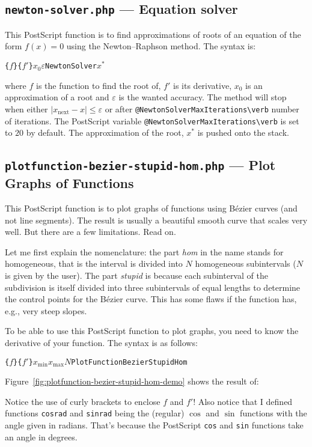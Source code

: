 \documentclass[10pt,a4paper]{scrartcl}
\newcommand\PS{PostScript}
\begin{document}
\subsection{\texttt{newton-solver.php} --- Equation solver}
\label{ssec:newton-solver.php}
This \PS{} function is to find approximations of roots of an equation
of the form $f(x)=0$ using the Newton--Raphson method. The syntax is:
\begin{center}
\texttt{\{}$f$\texttt{\}}\quad\texttt{\{}$f'$\texttt{\}}\quad$x_0$\quad$\varepsilon$\quad\texttt{NewtonSolver}\quad$x^*$
\end{center}
where $f$ is the function to find the root of, $f'$ is its derivative, $x_0$ is an approximation of a root
and $\varepsilon$ is the wanted accuracy. The method will stop when either $\lvert x_{\text{next}}-x\rvert\leq\varepsilon$
or after \verb=@NewtonSolverMaxIterations\verb= number of iterations. The \PS{} variable \verb=@NewtonSolverMaxIterations\verb=
is set to $20$ by default. The approximation of the root, $x^*$ is pushed onto the stack.

\subsection{\texttt{plotfunction-bezier-stupid-hom.php} --- Plot Graphs of Functions}
\label{ssec:plotfunction-bezier-stupid-hom.php}
This \PS{} function is to plot graphs of functions using B\'ezier curves (and not
line segments). The result is usually a beautiful smooth curve that scales very
well. But there are a few limitations. Read on.

Let me first explain the nomenclature: the part \emph{hom} in the name stands
for homogeneous, that is the interval is divided into $N$ homogeneous
subintervals ($N$ is given by the user). The part \emph{stupid} is because each subinterval
of the subdivision is itself divided into three subintervals of equal lengths to determine
the control points for the B\'ezier curve. This has some flaws if the function has, e.g.,
very steep slopes.

To be able to use this \PS{} function to plot graphs, you need to know the derivative of your function.
The syntax is as follows:
\begin{center}
\texttt{\{}$f$\texttt{\}}\quad\texttt{\{}$f'$\texttt{\}}\quad$x_{\text{min}}$\quad$x_{\text{max}}$\quad$N$\quad\texttt{PlotFunctionBezierStupidHom}
\end{center}

Figure~\ref{fig:plotfunction-bezier-stupid-hom-demo} shows the result of:

Notice the use of curly brackets to enclose $f$ and $f'$! Also notice that I
defined functions \texttt{cosrad} and \texttt{sinrad} being the (regular)
$\cos$ and $\sin$ functions with the angle given in radians. That's because the
\PS{} \texttt{cos} and \texttt{sin} functions take an angle in degrees.
\end{document}

